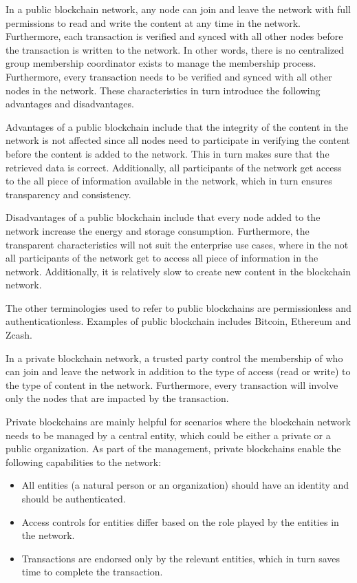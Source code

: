 \documentclass[a4paper]{article}
\begin{document}
In a public blockchain network,  any node can join and leave the network with full permissions to read and write the content at any time in the network. Furthermore, each transaction is verified and synced with all other nodes before the transaction is written to the network. In other words, there is no centralized group membership coordinator exists to manage the membership process. Furthermore, every transaction needs to be verified and synced with all other nodes in the network. These characteristics in turn introduce the following advantages and disadvantages. 

Advantages of a public blockchain include that the integrity of the content in the network is not affected since all nodes  need to participate in verifying the content before the content is added to the network. This in turn makes sure that the retrieved data is correct. Additionally, all participants of the network get access to the all piece of information  available in the network, which in turn ensures transparency and consistency. 

Disadvantages of a public blockchain include that every node added to the network increase the energy and storage consumption. Furthermore, the transparent characteristics will not suit the enterprise use cases, where in the not all participants of the network get to access all piece of information in the network. Additionally, it is relatively slow to create new content in the blockchain network. 

The other terminologies used to refer to public blockchains are permissionless and authenticationless.  Examples of public blockchain includes Bitcoin, Ethereum and Zcash. 

In a private blockchain network, a trusted party control the membership of who can join and leave  the network in addition to the type of access (read or write) to the type of content in the network. 
Furthermore, every transaction will involve only the nodes that are impacted by the transaction. 

Private blockchains are mainly helpful for scenarios where the blockchain network needs to be managed by a central entity, which could be either a private or a public organization. As part of the management, private blockchains enable the following capabilities to the network:
\begin{itemize}
\item All entities (a natural person or an organization)  should have an identity and should be authenticated.
\item Access controls for entities differ based on the role played by the entities in the network.
\item Transactions are endorsed only by the relevant entities, which in turn saves time to complete the transaction.
\end{itemize}
\end{document}

